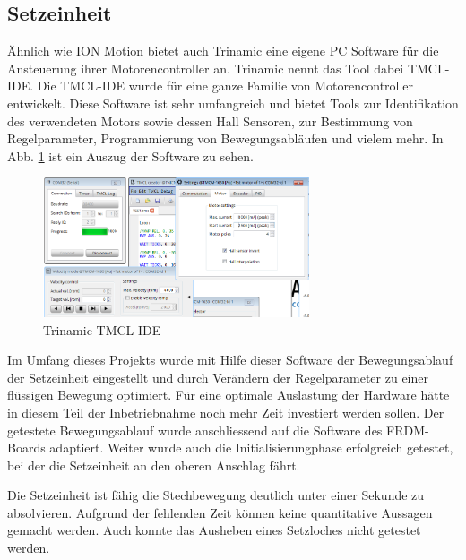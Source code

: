 \subsection{Setzeinheit} \label{sec:Inbetriebnahme_Setzeinheit}
Ähnlich wie ION Motion bietet auch Trinamic eine eigene PC Software für die Ansteuerung ihrer Motorencontroller an. Trinamic nennt das Tool dabei TMCL-IDE. Die TMCL-IDE wurde für eine ganze Familie von Motorencontroller entwickelt. Diese Software ist sehr umfangreich und bietet Tools zur Identifikation des verwendeten Motors sowie dessen Hall Sensoren, zur Bestimmung von Regelparameter, Programmierung von Bewegungsabläufen und vielem mehr. In Abb. \ref{fig:TMCL-IDE} ist ein Auszug der Software zu sehen.

\begin{figure}[H]
	\includegraphics[draft=false,width=0.7\textwidth]{Illustrationen/7-Inbetriebnahme_und_Kalibration/TMCL_IDE.png}
	\caption{Trinamic TMCL IDE}
	\label{fig:TMCL-IDE}
\end{figure}

Im Umfang dieses Projekts wurde mit Hilfe dieser Software der Bewegungsablauf der Setzeinheit eingestellt und durch Verändern der Regelparameter zu einer flüssigen Bewegung optimiert. Für eine optimale Auslastung der Hardware hätte in diesem Teil der Inbetriebnahme noch mehr Zeit investiert werden sollen. Der getestete Bewegungsablauf wurde anschliessend auf die Software des FRDM-Boards adaptiert. Weiter wurde auch die Initialisierungphase erfolgreich getestet, bei der die Setzeinheit an den oberen Anschlag fährt.

Die Setzeinheit ist fähig die Stechbewegung deutlich unter einer Sekunde zu absolvieren. Aufgrund der fehlenden Zeit können keine quantitative Aussagen gemacht werden. Auch konnte das Ausheben eines Setzloches nicht getestet werden.

